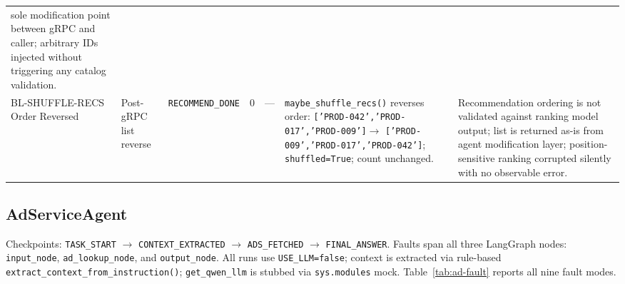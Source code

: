 \documentclass[conference]{IEEEtran}
\begin{document}
\begin{table}[!t]
\begin{tabularx}{\textwidth}{J{1.4cm}J{1.9cm}J{1.7cm}cJ{1.4cm}KK}
    sole modification point between gRPC and caller; arbitrary IDs injected
    without triggering any catalog validation. \\
BL-SHUFFLE-RECS Order Reversed
  & Post-gRPC list reverse
  & \texttt{RECOMMEND\_DONE}  & 0  & ---
  & \texttt{maybe\_shuffle\_recs()} reverses order:
    \texttt{['PROD-042','PROD-017','PROD-009']}$\to$%
    \texttt{['PROD-009','PROD-017','PROD-042']};
    \texttt{shuffled=True}; count unchanged.
  & Recommendation ordering is not validated against ranking model output; list
    is returned as-is from agent modification layer; position-sensitive ranking
    corrupted silently with no observable error. \\
\bottomrule
\end{tabularx}
\end{table}

\subsection{AdServiceAgent}

Checkpoints: \texttt{TASK\_START} $\to$ \texttt{CONTEXT\_EXTRACTED} $\to$
\texttt{ADS\_FETCHED} $\to$ \texttt{FINAL\_ANSWER}. Faults span all three
LangGraph nodes: \texttt{input\_node}, \texttt{ad\_lookup\_node}, and
\texttt{output\_node}. All runs use \texttt{USE\_LLM=false}; context is
extracted via rule-based \texttt{extract\_context\_from\_instruction()};
\texttt{get\_qwen\_llm} is stubbed via \texttt{sys.modules} mock.
Table~\ref{tab:ad-fault} reports all nine fault modes.
\end{document}
